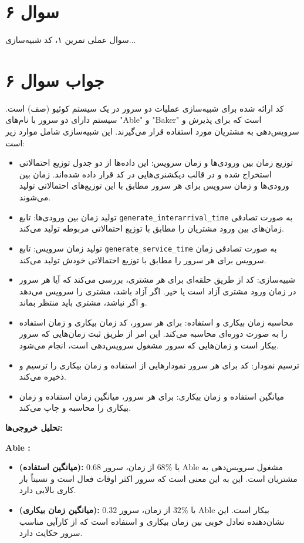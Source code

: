 \section*{سوال ۶}

سوال عملی تمرین ۱، کد شبیه‌سازی...
\section*{جواب سوال ۶}

کد ارائه شده برای شبیه‌سازی عملیات دو سرور در یک سیستم کوئیو (صف) است. سیستم دارای دو سرور با نام‌های "Able" و "Baker" است که برای پذیرش و سرویس‌دهی به مشتریان مورد استفاده قرار می‌گیرند. این شبیه‌سازی شامل موارد زیر است:

\begin{itemize}
	\item توزیع زمان بین ورودی‌ها و زمان سرویس: این داده‌ها از دو جدول توزیع احتمالاتی استخراج شده و در قالب دیکشنری‌هایی در کد قرار داده شده‌اند. زمان بین ورودی‌ها و زمان سرویس برای هر سرور مطابق با این توزیع‌های احتمالاتی تولید می‌شوند.
	\item تولید زمان بین ورودی‌ها: تابع \texttt{generate\_interarrival\_time} به صورت تصادفی زمان‌های بین ورود مشتریان را مطابق با توزیع احتمالاتی مربوطه تولید می‌کند.
	\item تولید زمان سرویس: تابع \texttt{generate\_service\_time} به صورت تصادفی زمان سرویس برای هر سرور را مطابق با توزیع احتمالاتی خودش تولید می‌کند.
	\item شبیه‌سازی: کد از طریق حلقه‌ای برای هر مشتری، بررسی می‌کند که آیا هر سرور در زمان ورود مشتری آزاد است یا خیر. اگر آزاد باشد، مشتری را سرویس می‌دهد و اگر نباشد، مشتری باید منتظر بماند.
	\item محاسبه زمان بیکاری و استفاده: برای هر سرور، کد زمان بیکاری و زمان استفاده را به صورت دوره‌ای محاسبه می‌کند. این امر از طریق ثبت زمان‌هایی که سرور بیکار است و زمان‌هایی که سرور مشغول سرویس‌دهی است، انجام می‌شود.
	\item ترسیم نمودار: کد برای هر سرور نمودارهایی از استفاده و زمان بیکاری را ترسیم و ذخیره می‌کند.
	\item میانگین استفاده و زمان بیکاری: برای هر سرور، میانگین زمان استفاده و زمان بیکاری را محاسبه و چاپ می‌کند.
\end{itemize}

\textbf{تحلیل خروجی‌ها:}

\textbf{Able :}
\begin{itemize}
	\item \textbf{ (میانگین استفاده):} \(0.68\) یا \(68\%\) از زمان، سرور Able مشغول سرویس‌دهی به مشتریان است. این به این معنی است که سرور اکثر اوقات فعال است و نسبتاً بار کاری بالایی دارد.
	\item \textbf{ (میانگین زمان بیکاری):} \(0.32\) یا \(32\%\) از زمان، سرور Able بیکار است. این نشان‌دهنده تعادل خوبی بین زمان بیکاری و استفاده است که از کارآیی مناسب سرور حکایت دارد.
\end{itemize}


